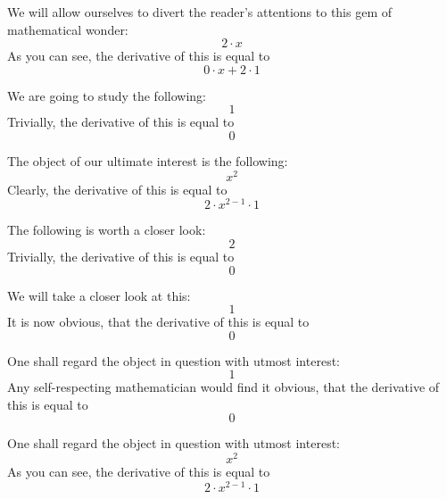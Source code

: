 \documentclass{article}
\begin{document}
We will allow ourselves to divert the reader's attentions to this gem of mathematical wonder:
\begin{equation}
2 \cdot x 
\end{equation}
As you can see, the derivative of this is equal to
\begin{equation}
0 \cdot x + 2 \cdot 1 
\end{equation}

We are going to study the following:
\begin{equation}
1 
\end{equation}
Trivially, the derivative of this is equal to
\begin{equation}
0 
\end{equation}

The object of our ultimate interest is the following:
\begin{equation}
x ^{2 } 
\end{equation}
Clearly, the derivative of this is equal to
\begin{equation}
2 \cdot x ^{2 - 1 } \cdot 1 
\end{equation}

The following is worth a closer look:
\begin{equation}
2 
\end{equation}
Trivially, the derivative of this is equal to
\begin{equation}
0 
\end{equation}

We will take a closer look at this:
\begin{equation}
1 
\end{equation}
It is now obvious, that the derivative of this is equal to
\begin{equation}
0 
\end{equation}

One shall regard the object in question with utmost interest:
\begin{equation}
1 
\end{equation}
Any self-respecting mathematician would find it obvious, that the derivative of this is equal to
\begin{equation}
0 
\end{equation}

One shall regard the object in question with utmost interest:
\begin{equation}
x ^{2 } 
\end{equation}
As you can see, the derivative of this is equal to
\begin{equation}
2 \cdot x ^{2 - 1 } \cdot 1 
\end{equation}
\end{document}
